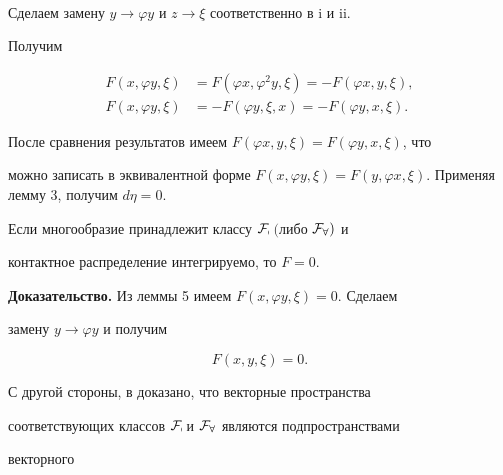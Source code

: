 \begin{pf}
\begin{align*}
\end{align*} 


Сделаем замену $y\to\varphi y$ и $z\to\xi$ соответственно в i и ii. 


Получим 


\begin{align*} 


F(x,\varphi y,\xi)&=F(\varphi x,\varphi ^2y,\xi)= 


-F(\varphi x,y,\xi),\\ 


F(x,\varphi y,\xi)&=-F(\varphi y,\xi,x)= 


-F(\varphi y,x,\xi). 


\end{align*} 


После сравнения результатов имеем $F(\varphi x,y,\xi)=F(\varphi 


y,x,\xi)$, что 


можно записать в эквивалентной форме $F(x,\varphi y,\xi)=F(y,\varphi 


x,\xi)$. Применяя лемму 3, получим $d\eta=0$. 


\end{pf} 


 


\begin{thm} 


Если многообразие принадлежит классу $\cal F_7$ $($либо $\cal F_8)$ и 


контактное распределение интегрируемо, то $F=0$. 


\end{thm} 


 


{\bf Доказательство.} Из леммы 5 имеем $F(x,\varphi y,\xi)=0$. Сделаем 


замену $y\to\varphi y$ и получим 


\begin{equation} 


F(x,y,\xi)=0. 


\end{equation} 


 


С другой стороны, в \cite{1} доказано, что векторные пространства 


соответствующих классов $\cal F_7$ и $\cal F_8$ являются подпространствами 


векторного 


